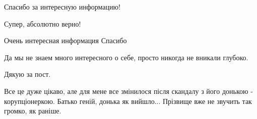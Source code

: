 \begin{itemize}
 
Спасибо за интересную информацию!

 
Супер, абсолютно верно!

 
Очень интересная информация
Спасибо

 
Да мы не знаем много интересного о себе, просто никогда не вникали глубоко.

 
Дякую за пост.

 

Все це дуже цікаво, але для мене все змінилося після скандалу з його донькою -
корупціонеркою. Батько геній, донька як вийшло... Прізвище вже не звучить так
громко, як раніше.

\begin{itemize}
 

\end{itemize}
\end{itemize}
